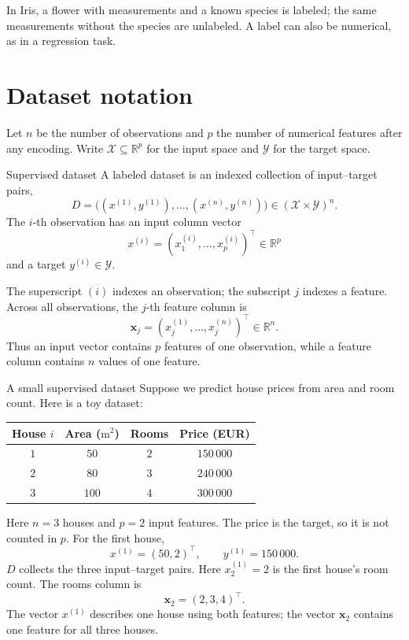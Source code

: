 \documentclass[a4paper,12pt,oneside]{report}
\begin{document}
In Iris, a flower with measurements and a known species is labeled;
the same measurements without the species are unlabeled. A label can
also be numerical, as in a regression task.

\clearpage
\section{Dataset notation}

Let $n$ be the number of observations and $p$ the number of numerical
features after any encoding. Write $\mathcal{X}\subseteq\mathbb{R}^{p}$
for the input space and $\mathcal{Y}$ for the target space.

\begin{frameddefn}{Supervised dataset}\label{def:dataset}
A labeled dataset is an indexed collection of input--target pairs,
\[
  D=\bigl((x^{(1)},y^{(1)}),\ldots,(x^{(n)},y^{(n)})\bigr)
    \in(\mathcal{X}\times\mathcal{Y})^{n}.
\]
The $i$-th observation has an input column vector
\[
  x^{(i)}=(x_1^{(i)},\ldots,x_p^{(i)})^\top\in\mathbb{R}^{p}
\]
and a target $y^{(i)}\in\mathcal{Y}$.
\end{frameddefn}

The superscript $(i)$ indexes an observation; the subscript $j$ indexes
a feature. Across all observations, the $j$-th feature column is
\[
  \mathbf{x}_j=(x_j^{(1)},\ldots,x_j^{(n)})^\top\in\mathbb{R}^{n}.
\]
Thus an input vector contains $p$ features of one observation, while a
feature column contains $n$ values of one feature.

\begin{framedexample}{A small supervised dataset}
Suppose we predict house prices from area and room count. Here is a toy dataset:
\begin{center}
\begin{tabular}{@{}cccc@{}}
\toprule
\textbf{House $i$} & \textbf{Area ($\mathrm{m}^2$)} & \textbf{Rooms} & \textbf{Price (EUR)} \\
\midrule
$1$ & $50$  & $2$ & $150\,000$ \\
$2$ & $80$  & $3$ & $240\,000$ \\
$3$ & $100$ & $4$ & $300\,000$ \\
\bottomrule
\end{tabular}
\end{center}
Here $n=3$ houses and $p=2$ input features. The price is the target,
so it is not counted in $p$. For the first house,
\[
  x^{(1)}=(50,2)^\top,
  \qquad y^{(1)}=150\,000.
\]
$D$ collects the three input--target pairs. Here $x_2^{(1)}=2$ is the
first house's room count. The rooms column is
\[
  \mathbf{x}_2=(2,3,4)^\top.
\]
The vector $x^{(1)}$ describes one house using both features; the vector
$\mathbf{x}_2$ contains one feature for all three houses.
\end{framedexample}
\end{document}
